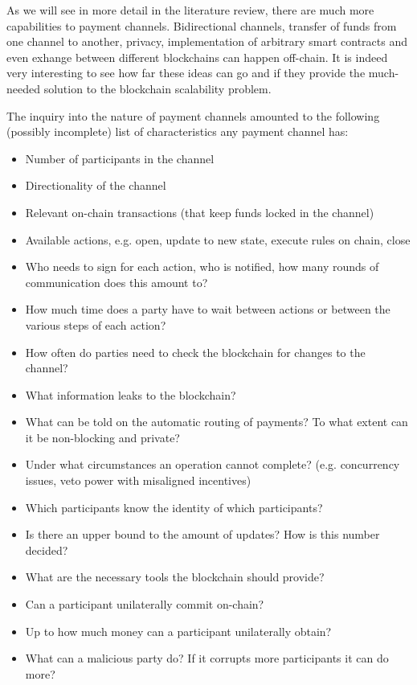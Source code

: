   As we will see in more detail in the literature review, there are much more capabilities
  to payment channels. Bidirectional channels, transfer of funds from one channel to
  another, privacy, implementation of arbitrary smart contracts and even exhange between
  different blockchains can happen off-chain. It is indeed very interesting to see how far
  these ideas can go and if they provide the much-needed solution to the blockchain
  scalability problem.

  The inquiry into the nature of payment channels amounted to the following (possibly
  incomplete) list of characteristics any payment channel has:
  \begin{itemize}
    \item Number of participants in the channel
    \item Directionality of the channel
    \item Relevant on-chain transactions (that keep funds locked in the channel)
    \item Available actions, e.g. open, update to new state, execute rules on chain, close
    \item Who needs to sign for each action, who is notified, how many rounds of
    communication does this amount to?
    \item How much time does a party have to wait between actions or between the various
    steps of each action?
    \item How often do parties need to check the blockchain for changes to the channel?
    \item What information leaks to the blockchain?
    \item What can be told on the automatic routing of payments? To what extent can it be
    non-blocking and private?
    \item Under what circumstances an operation cannot complete? (e.g. concurrency issues,
    veto power with misaligned incentives)
    \item Which participants know the identity of which participants?
    \item Is there an upper bound to the amount of updates? How is this number decided?
    \item What are the necessary tools the blockchain should provide?
    \item Can a participant unilaterally commit on-chain?
    \item Up to how much money can a participant unilaterally obtain?
    \item What can a malicious party do? If it corrupts more participants it can do more?

\end{itemize}
